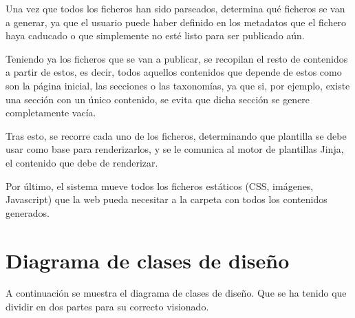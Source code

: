Una vez que todos los ficheros han sido parseados, determina qué ficheros se van a generar, ya que
el usuario puede haber definido en los metadatos que el fichero haya caducado o que simplemente
no esté listo para ser publicado aún.

Teniendo ya los ficheros que se van a publicar, se recopilan el resto de contenidos a partir de estos, es decir,
todos aquellos contenidos que depende de estos como son la página inicial, las secciones o las taxonomías,
ya que si, por ejemplo, existe una sección con un único contenido, se evita que dicha sección se genere
completamente vacía.

Tras esto, se recorre cada uno de los ficheros, determinando que plantilla se debe usar como base para renderizarlos,
y se le comunica al motor de plantillas Jinja, el contenido que debe de renderizar.

Por último, el sistema mueve todos los ficheros estáticos (CSS, imágenes, Javascript) que la web pueda necesitar
a la carpeta con todos los contenidos generados.



\section{Diagrama de clases de diseño}

A continuación se muestra el diagrama de clases de diseño. Que se ha tenido que dividir en dos partes
para su correcto visionado.

